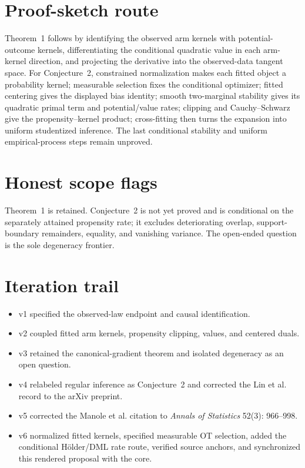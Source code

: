 \documentclass[11pt]{article}
\begin{document}
\section{Proof-sketch route}
Theorem~1 follows by identifying the observed arm kernels with potential-outcome kernels, differentiating the conditional quadratic value in each arm-kernel direction, and projecting the derivative into the observed-data tangent space. For Conjecture~2, constrained normalization makes each fitted object a probability kernel; measurable selection fixes the conditional optimizer; fitted centering gives the displayed bias identity; smooth two-marginal stability gives its quadratic primal term and potential/value rates; clipping and Cauchy--Schwarz give the propensity--kernel product; cross-fitting then turns the expansion into uniform studentized inference. The last conditional stability and uniform empirical-process steps remain unproved.

\section{Honest scope flags}
Theorem~1 is retained. Conjecture~2 is not yet proved and is conditional on the separately attained propensity rate; it excludes deteriorating overlap, support-boundary remainders, equality, and vanishing variance. The open-ended question is the sole degeneracy frontier.

\section{Iteration trail}
\begin{itemize}[leftmargin=*]
\item v1 specified the observed-law endpoint and causal identification.
\item v2 coupled fitted arm kernels, propensity clipping, values, and centered duals.
\item v3 retained the canonical-gradient theorem and isolated degeneracy as an open question.
\item v4 relabeled regular inference as Conjecture~2 and corrected the Lin et al. record to the arXiv preprint.
\item v5 corrected the Manole et al. citation to \emph{Annals of Statistics} 52(3): 966--998.
\item v6 normalized fitted kernels, specified measurable OT selection, added the conditional Hölder/DML rate route, verified source anchors, and synchronized this rendered proposal with the core.
\end{itemize}
\end{document}

